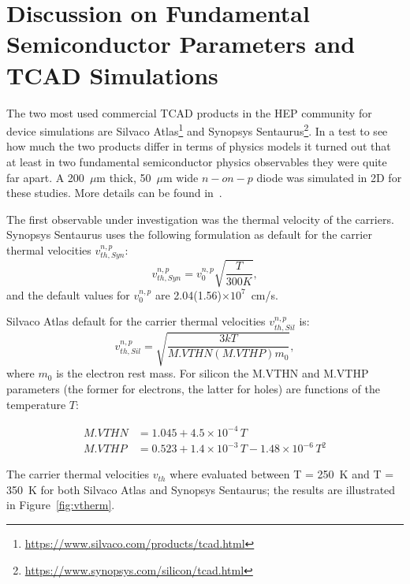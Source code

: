 \section{Discussion on Fundamental  Semiconductor Parameters and TCAD Simulations}
\label{sec:TCADfund}
The two most used commercial TCAD products in the HEP community for device simulations 
are Silvaco Atlas\footnote{\url{https://www.silvaco.com/products/tcad.html}} and Synopsys 
Sentaurus\footnote{\url{https://www.synopsys.com/silicon/tcad.html}}.
In a test to see how much the two products differ in terms of physics models it turned out 
that at least in two fundamental semiconductor physics observables they were quite far apart. 
A  200~$\mu$m thick,  50~$\mu$m wide $n-on-p$ diode was simulated in 2D for these studies. More details can be found in~\cite{bomben_rd50_Torino}.



The first observable under investigation was the thermal velocity of the carriers. 
Synopsys Sentaurus uses the following formulation as default for the carrier thermal velocities $v_{th,Syn}^{n,p}$:
\begin{equation}
v_{th,Syn}^{n,p} = v_0^{n,p}\sqrt{\dfrac{T}{300 K}},
\label{eq:SynThVel}
\end{equation}
and the default values for $v_0^{n,p}$ are 2.04(1.56)$\times10^{7}$~cm/s.

\noindent Silvaco Atlas default for the carrier thermal velocities $v_{th,Sil}^{n,p}$ is:
\begin{equation}
v_{th,Sil}^{n,p} = \sqrt{\dfrac{3kT}{M.VTHN(M.VTHP)m_0}},
\label{eq:SilThVel}
\end{equation}
where $m_0$ is the electron rest mass. 
For silicon the M.VTHN and M.VTHP parameters (the former for electrons, the latter for holes) 
 are functions of the temperature $T$:

\begin{align}
M.VTHN & = 1.045 + 4.5\times10^{-4}\,T\\
M.VTHP & =    0.523 + 1.4 \times10^{-3}\,T -1.48\times10^{-6}\,T^2
\end{align}

The carrier thermal velocities $v_{th}$ where evaluated between T = 250~K and T = 350~K for both 
Silvaco Atlas and Synopsys Sentaurus; 
the results 
are illustrated in Figure~\ref{fig:vtherm}.

